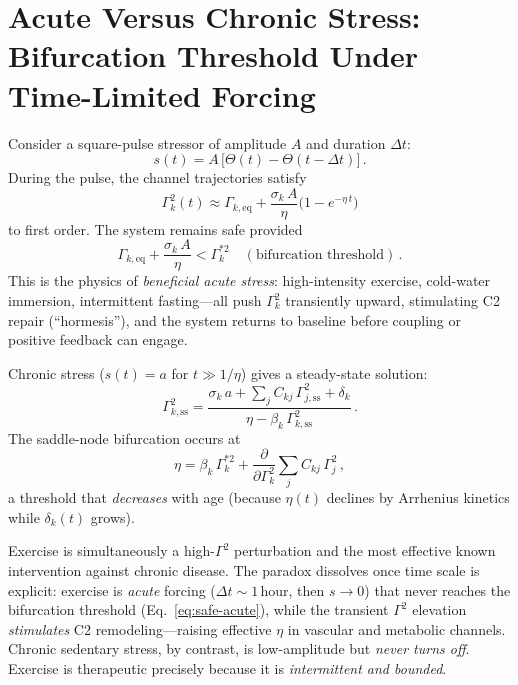 \documentclass[aps,pre,twocolumn,superscriptaddress,floatfix]{revtex4-2}
\begin{document}
\section{Acute Versus Chronic Stress:
  Bifurcation Threshold Under Time-Limited Forcing}
\label{sec:acute-chronic}

Consider a square-pulse stressor of amplitude $A$
and duration $\Delta t$:
\begin{equation}
  s(t) = A\,\bigl[\Theta(t) - \Theta(t - \Delta t)
  \bigr]\,.
  \label{eq:pulse-stress}
\end{equation}
During the pulse, the channel trajectories satisfy
\begin{equation}
  \Gamma_k^2(t) \approx \Gamma_{k,\text{eq}}
  + \frac{\sigma_k\,A}{\eta}
    \bigl(1 - e^{-\eta\,t}\bigr)
  \label{eq:acute-response}
\end{equation}
to first order.
The system remains safe provided
\begin{equation}
  \Gamma_{k,\text{eq}} + \frac{\sigma_k\,A}{\eta}
  < \Gamma_k^{*2}
  \quad (\text{bifurcation threshold})\,.
  \label{eq:safe-acute}
\end{equation}
This is the physics of \emph{beneficial acute
stress}: high-intensity exercise, cold-water
immersion, intermittent fasting---all push
$\Gamma_k^2$ transiently upward, stimulating C2
repair (``hormesis''), and the system returns to
baseline before coupling or positive feedback can
engage.

Chronic stress
($s(t) = a$ for $t \gg 1/\eta$) gives a
steady-state solution:
\begin{equation}
  \Gamma_{k,\text{ss}}^2
  = \frac{\sigma_k\,a
    + \sum_j C_{kj}\,\Gamma_{j,\text{ss}}^2
    + \delta_k}
    {\eta - \beta_k\,\Gamma_{k,\text{ss}}^2}\,.
  \label{eq:chronic-ss}
\end{equation}
The saddle-node bifurcation occurs at
\begin{equation}
  \eta = \beta_k\,\Gamma_k^{*2}
         + \frac{\partial}{\partial\Gamma_k^2}
           \sum_j C_{kj}\,\Gamma_j^2\,,
  \label{eq:chronic-bifurcation}
\end{equation}
a threshold that \emph{decreases} with age
(because $\eta(t)$ declines by Arrhenius kinetics
while $\delta_k(t)$ grows).

\begin{remark}
\label{rem:exercise}
Exercise is simultaneously a high-$\Gamma^2$
perturbation and the most effective known
intervention against chronic disease.
The paradox dissolves once time scale is explicit:
exercise is \emph{acute} forcing
($\Delta t \sim 1$\,hour, then $s \to 0$)
that never reaches the bifurcation threshold
(Eq.~\ref{eq:safe-acute}), while the transient
$\Gamma^2$ elevation \emph{stimulates} C2
remodeling---raising effective $\eta$ in vascular
and metabolic channels.
Chronic sedentary stress, by contrast, is
low-amplitude but \emph{never turns off}.
Exercise is therapeutic precisely because it is
\emph{intermittent and bounded}.
\end{remark}
\end{document}
